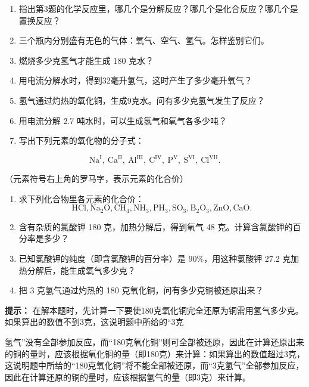 \begin{enumerate}[start=4]
\item
  指出第3题的化学反应里，哪几个是分解反应？哪几个是化合反应？哪几个是置换反应？
\item
  三个瓶内分别盛有无色的气体：氧气、空气、氢气。怎样鉴别它们。
\item
  燃烧多少克氢气才能生成 180 克水？
\item
  用电流分解水时，得到32毫升氢气，这时产生了多少毫升氧气？
\item
  氢气通过灼热的氧化铜，生成9克水。问有多少克氢气发生了反应？
\item
  用电流分解 2.7 吨水时，可以生成氢气和氧气各多少吨？
\item
  写出下列元素的氧化物的分子式：
\end{enumerate}

\[
\mathrm{Na}^{\mathrm{I}},\ \mathrm{Ca}^{\mathrm{II}},\ \mathrm{Al}^{\mathrm{III}},\ \mathrm{C}^{\mathrm{IV}},\ \mathrm{P}^{\mathrm{V}},\ \mathrm{S}^{\mathrm{VI}},\ \mathrm{Cl}^{\mathrm{VII}}.
\]

（元素符号右上角的罗马字，表示元素的化合价）

\begin{enumerate}[start=11]
\item
  求下列化合物里各元素的化合价：
\[
\mathrm{HCl}, \mathrm{Na}_{2} \mathrm{O}, \mathrm{CH}_{4}, \mathrm{NH}_{3}, \mathrm{PH}_{3}, \mathrm{SO}_{3}, \mathrm{B}_{2} \mathrm{O}_{3}, \mathrm{ZnO}, \mathrm{CaO}.
\]
\item
  含有杂质的氯酸钾 180 克，加热分解后，得到氧气 48
  克。计算含氯酸钾的百分率是多少？
\item
  已知氯酸钾的纯度（即含氯酸钾的百分率）是 \(90\%\)，用这种氯酸钾 27.2
  克加热分解后，能生成氧气多少克？
\item
  把 3 克氢气通过灼热的 180 克氧化铜，问有多少克铜被还原出来？
\end{enumerate}

\begin{shulihuadef}
\textbf{提示：}
在解本题时，先计算一下要使180克氧化铜完全还原为铜需用氢气多少克。如果算出的数值不到3克，这说明题中所给的``3克
\end{shulihuadef}

氢气''没有全部参加反应，而``180克氧化铜''则可全部被还原，因此在计算还原出来的铜的量时，应该根据氧化铜的量（即180克）来计算：如果算出的数值超过3克，这说明题中所给的``180克氧化铜''将不能全部被还原，而``3克氢气''全部参加反应，因此在计算还原的铜的量时，应该根据氢气的量（即3克）来计算。

